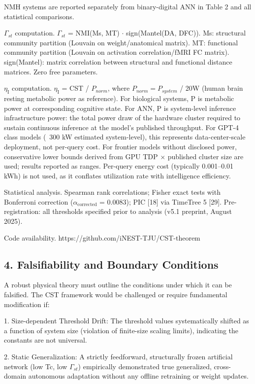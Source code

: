 \documentclass[a4paper,12pt]{article}
\begin{document}
\dag{}NMH systems are reported separately from binary-digital ANN in Table 2 and all statistical comparisons.

$\Gamma_{st}$ computation. $\Gamma_{st}$ = NMI(Ms, MT)  $\cdot$  sign(Mantel(DA, DFC)). Ms: structural community partition (Louvain on weight/anatomical matrix). MT: functional community partition (Louvain on activation correlation/fMRI FC matrix). sign(Mantel): matrix correlation between structural and functional distance matrices. Zero free parameters.

$\eta_{\text{I}}$ computation. $\eta_{\text{I}}$ = CST / $P_{norm}$, where $P_{norm} = P_{system}$ / 20W (human brain resting metabolic power as reference).
For biological systems, P is metabolic power at corresponding cognitive state.
For ANN, P is system-level inference infrastructure power: the total power draw of the hardware cluster required to sustain continuous inference at the model's published throughput.
For GPT-4 class models (~300 kW estimated system-level), this represents data-center-scale deployment, not per-query cost.
For frontier models without disclosed power, conservative lower bounds derived from GPU TDP  $\times$  published cluster size are used; results reported as ranges.
Per-query energy cost (typically 0.001--0.01 kWh) is not used, as it conflates utilization rate with intelligence efficiency.

Statistical analysis. Spearman rank correlations; Fisher exact tests with Bonferroni correction ($\alpha_{\text{corrected}}$ = 0.0083); PIC [18] via TimeTree 5 [29]. Pre-registration: all thresholds specified prior to analysis (v5.1 preprint, August 2025).

Code availability. https://github.com/iNEST-TJU/CST-theorem

\subsection{4. Falsifiability and Boundary Conditions}

A robust physical theory must outline the conditions under which it can be falsified. The CST framework would be challenged or require fundamental modification if:

1. Size-dependent Threshold Drift: The threshold values systematically shifted as a function of system size (violation of finite-size scaling limits), indicating the constants are not universal.

2. Static Generalization: A strictly feedforward, structurally frozen artificial network (low Tc, low $\Gamma_{st}$) empirically demonstrated true generalized, cross-domain autonomous adaptation without any offline retraining or weight updates.
\end{document}
